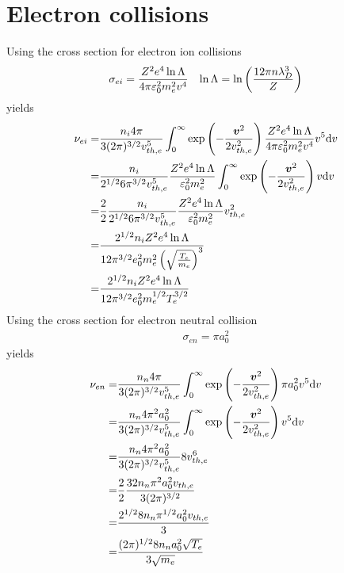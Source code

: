 \section{Electron collisions}
\label{sec:nue}
Using the cross section for electron ion collisions
%
\begin{align*}
    \sigma_{ei} = \frac{Z^2e^4\ln\Lambda}{4\pi\varepsilon_0^2m_e^2v^4}
    &&
    \ln\Lambda = \ln\left(\frac{12\pi n \lambda_D^3}{Z}\right)
\end{align*}
%
yields
%
\begin{align*}
    \nu_{ei}
    =&
    \frac{n_i4\pi}{3(2\pi)^{3/2}v_{th,e}^5}
    \int_0^\infty
    \exp\left(-\frac{\boldsymbol{v}^2}{2v_{th,e}^2}\right)
    \frac{Z^2e^4\ln\Lambda}{4\pi\varepsilon_0^2m_e^2v^4} v^5
    \text{d} v
    \\
    =&
    \frac{n_i}{2^{1/2}6\pi^{3/2}v_{th,e}^5}
    \frac{Z^2e^4\ln\Lambda}{\varepsilon_0^2m_e^2}
    \int_0^\infty
    \exp\left(-\frac{\boldsymbol{v}^2}{2v_{th,e}^2}\right)
    v \text{d} v
    \\
    =&
    \frac{2}{2}
    \frac{n_i}{2^{1/2}6\pi^{3/2}v_{th,e}^5}
    \frac{Z^2e^4\ln\Lambda}{\varepsilon_0^2m_e^2}
    v_{th,e}^2
    \\
    =&
    \frac{2^{1/2}n_iZ^2e^4\ln\Lambda}{12\pi^{3/2}e_0^2m_e^2\left(\sqrt{\frac{T_e}{m_e}}\right)^3}
    \\
    =&
    \frac{2^{1/2}n_iZ^2e^4\ln\Lambda}{12\pi^{3/2}e_0^2m_e^{1/2}T_e^{3/2}}
\end{align*}
%
Using the cross section for electron neutral collision
%
\begin{align*}
    \sigma_{en} = \pi a_0^2
\end{align*}
%
yields
%
\begin{align*}
    \nu_{en}
    =&
    \frac{n_n4\pi}{3(2\pi)^{3/2}v_{th,e}^5}
    \int_0^\infty
    \exp\left(-\frac{\boldsymbol{v}^2}{2v_{th,e}^2}\right)
    \pi a_0^2 v^5
    \text{d} v
    \\
    =&
    \frac{n_n4\pi^2 a_0^2 }{3(2\pi)^{3/2}v_{th,e}^5}
    \int_0^\infty
    \exp\left(-\frac{\boldsymbol{v}^2}{2v_{th,e}^2}\right)
    v^5
    \text{d} v
    \\
    =&
    \frac{n_n4\pi^2 a_0^2 }{3(2\pi)^{3/2}v_{th,e}^5} 8v_{th,e}^6
    \\
    =&
    \frac{2}{2}
    \frac{32 n_n\pi^2 a_0^2 v_{th,e}}{3(2\pi)^{3/2}}
    \\
    =&
    \frac{2^{1/2}8 n_n\pi^{1/2} a_0^2 v_{th,e}}{3}
    \\
    =&
    \frac{(2\pi)^{1/2}8 n_n a_0^2 \sqrt{T_e}}{3\sqrt{m_e}}
\end{align*}
%

